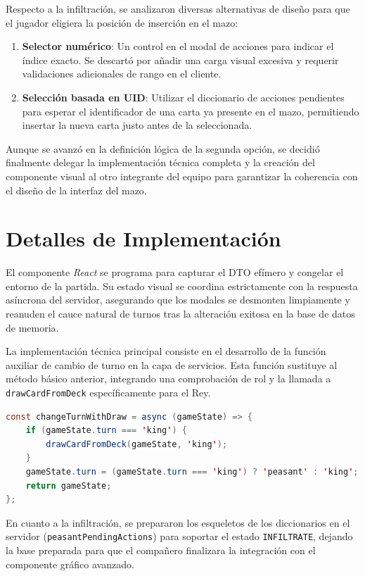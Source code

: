 Respecto a la infiltración, se analizaron diversas alternativas de diseño para que el jugador eligiera la posición de inserción en el mazo:
\begin{enumerate}
    \item \textbf{Selector numérico}: Un control en el modal de acciones para indicar el índice exacto. Se descartó por añadir una carga visual excesiva y requerir validaciones adicionales de rango en el cliente.
    \item \textbf{Selección basada en UID}: Utilizar el diccionario de acciones pendientes para esperar el identificador de una carta ya presente en el mazo, permitiendo insertar la nueva carta justo antes de la seleccionada.
\end{enumerate}
Aunque se avanzó en la definición lógica de la segunda opción, se decidió finalmente delegar la implementación técnica completa y la creación del componente visual al otro integrante del equipo para garantizar la coherencia con el diseño de la interfaz del mazo.

\section{Detalles de Implementación}
El componente \textit{React} se programa para capturar el DTO efímero y congelar el entorno de la partida. Su estado visual se coordina estrictamente con la respuesta asíncrona del servidor, asegurando que los modales se desmonten limpiamente y reanuden el cauce natural de turnos tras la alteración exitosa en la base de datos de memoria.

La implementación técnica principal consiste en el desarrollo de la función auxiliar de cambio de turno en la capa de servicios. Esta función sustituye al método básico anterior, integrando una comprobación de rol y la llamada a \texttt{drawCardFromDeck} específicamente para el Rey.

\begin{lstlisting}[language=Java,basicstyle=\scriptsize\ttfamily,caption={Logica de cambio de turno con robo automático para el bando real},label={cod:king_draw_logic},breaklines=true]
const changeTurnWithDraw = async (gameState) => {
    if (gameState.turn === 'king') {
        drawCardFromDeck(gameState, 'king');
    }
    gameState.turn = (gameState.turn === 'king') ? 'peasant' : 'king';
    return gameState;
};
\end{lstlisting}

En cuanto a la infiltración, se prepararon los esqueletos de los diccionarios en el servidor (\texttt{peasantPendingActions}) para soportar el estado \texttt{INFILTRATE}, dejando la base preparada para que el compañero finalizara la integración con el componente gráfico avanzado.

